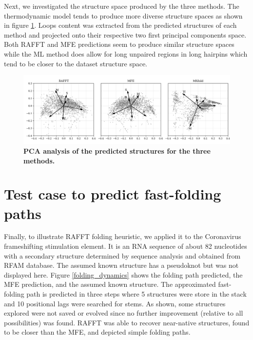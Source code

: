\documentclass[a4paper,12pt]{article}
\begin{document}
{{Next, we investigated the structure space produced by the three methods. The
thermodynamic model tends to produce more diverse structure spaces as shown in
figure \ref{pred_struct_space}. Loops content was extracted from the predicted
structures of each method and projected onto their respective two first
principal components space. Both RAFFT and MFE predictions seem to produce
similar structure spaces while the ML method does allow for long unpaired
regions in long hairpins which tend to be closer to the dataset structure space.

\begin{figure}[htbp]
\centering
\includegraphics[width=.9\linewidth]{img/content_predicted_data.png}
\caption{\label{pred_struct_space}\textbf{PCA analysis of the predicted structures for the three methods.}}
\end{figure}

\clearpage
\section{Test case to predict fast-folding paths}
\label{sec:org910fe3d}
Finally, to illustrate RAFFT folding heuristic, we applied it to the Coronavirus
frameshifting stimulation element. It is an RNA sequence of about 82 nucleotides
with a secondary structure determined by sequence analysis and obtained from
RFAM database. The assumed known structure has a pseudoknot but was not
displayed here. Figure \ref{folding_dynamics} shows the folding path predicted,
the MFE prediction, and the assumed known structure. The approximated
fast-folding path is predicted in three steps where 5 structures were store in
the stack and 10 positional lags were searched for stems. As shown, some
structures explored were not saved or evolved since no further improvement
(relative to all possibilities) was found. RAFFT was able to recover near-native
structures, found to be closer than the MFE, and depicted simple folding paths.

}}
\end{document}
